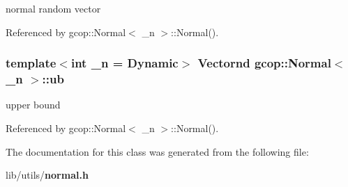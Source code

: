 normal random vector 



\-Referenced by gcop\-::\-Normal$<$ \-\_\-n $>$\-::\-Normal().

\subsubsection[{ub}]{\setlength{\rightskip}{0pt plus 5cm}template$<$int \-\_\-n = \-Dynamic$>$ {\bf \-Vectornd} {\bf gcop\-::\-Normal}$<$ \-\_\-n $>$\-::{\bf ub}}\label{classgcop_1_1Normal_a9fb03d0b67d8f275dd407a3eb2e2b440}


upper bound 



\-Referenced by gcop\-::\-Normal$<$ \-\_\-n $>$\-::\-Normal().



\-The documentation for this class was generated from the following file\-:\begin{DoxyCompactItemize}
\item 
lib/utils/{\bf normal.\-h}\end{DoxyCompactItemize}
